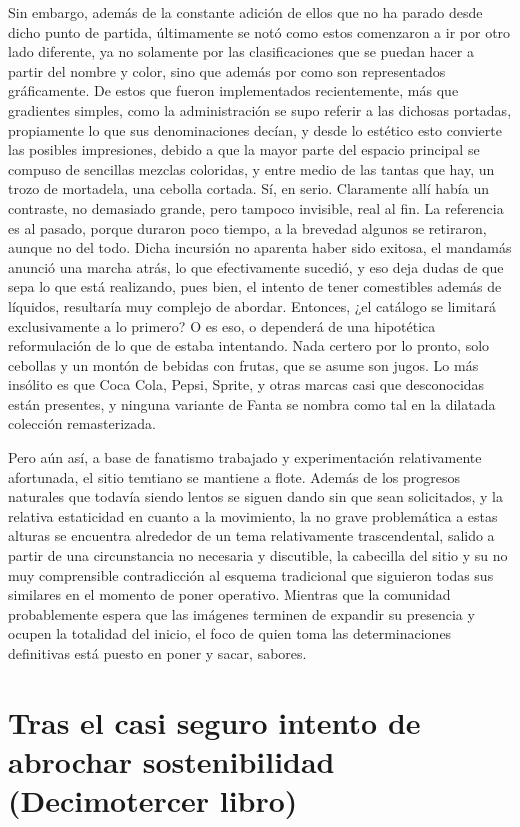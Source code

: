 \documentclass[
]{book}
\begin{document}
Sin embargo, además de la constante adición de ellos que no ha parado desde dicho punto de partida, últimamente se notó como estos comenzaron a ir por otro lado diferente, ya no solamente por las clasificaciones que se puedan hacer a partir del nombre y color, sino que además por como son representados gráficamente. De estos que fueron implementados recientemente, más que gradientes simples, como la administración se supo referir a las dichosas portadas, propiamente lo que sus denominaciones decían, y desde lo estético esto convierte las posibles impresiones, debido a que la mayor parte del espacio principal se compuso de sencillas mezclas coloridas, y entre medio de las tantas que hay, un trozo de mortadela, una cebolla cortada. Sí, en serio. Claramente allí había un contraste, no demasiado grande, pero tampoco invisible, real al fin. La referencia es al pasado, porque duraron poco tiempo, a la brevedad algunos se retiraron, aunque no del todo. Dicha incursión no aparenta haber sido exitosa, el mandamás anunció una marcha atrás, lo que efectivamente sucedió, y eso deja dudas de que sepa lo que está realizando, pues bien, el intento de tener comestibles además de líquidos, resultaría muy complejo de abordar. Entonces, ¿el catálogo se limitará exclusivamente a lo primero? O es eso, o dependerá de una hipotética reformulación de lo que de estaba intentando. Nada certero por lo pronto, solo cebollas y un montón de bebidas con frutas, que se asume son jugos. Lo más insólito es que Coca Cola, Pepsi, Sprite, y otras marcas casi que desconocidas están presentes, y ninguna variante de Fanta se nombra como tal en la dilatada colección remasterizada.

Pero aún así, a base de fanatismo trabajado y experimentación relativamente afortunada, el sitio temtiano se mantiene a flote. Además de los progresos naturales que todavía siendo lentos se siguen dando sin que sean solicitados, y la relativa estaticidad en cuanto a la movimiento, la no grave problemática a estas alturas se encuentra alrededor de un tema relativamente trascendental, salido a partir de una circunstancia no necesaria y discutible, la cabecilla del sitio y su no muy comprensible contradicción al esquema tradicional que siguieron todas sus similares en el momento de poner operativo. Mientras que la comunidad probablemente espera que las imágenes terminen de expandir su presencia y ocupen la totalidad del inicio, el foco de quien toma las determinaciones definitivas está puesto en poner y sacar, sabores.

\hypertarget{tras-el-casi-seguro-intento-de-abrochar-sostenibilidad-decimotercer-libro}{%
\chapter{Tras el casi seguro intento de abrochar sostenibilidad (Decimotercer libro)}\label{tras-el-casi-seguro-intento-de-abrochar-sostenibilidad-decimotercer-libro}}
\end{document}
